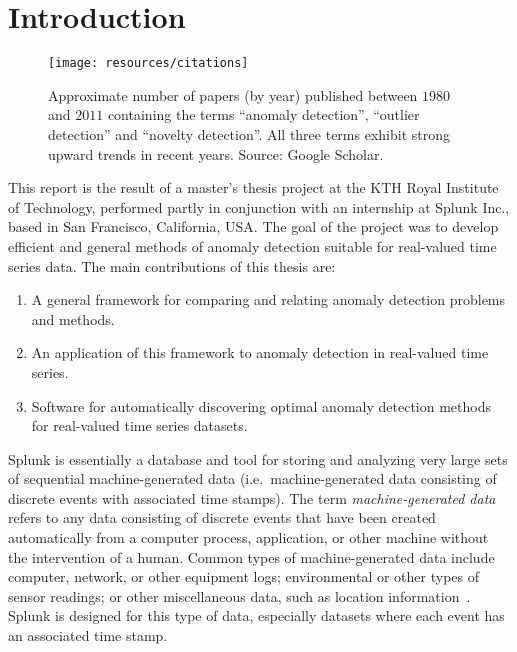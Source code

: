 \chapter{Introduction}

\begin{figure}[htb]
    \vspace{-10pt}
    \begin{center}
        \texttt{[image: resources/citations]}
    \end{center}
    \vspace{-20pt}
    \caption{\small Approximate number of papers (by year) published between $1980$ and $2011$ containing the terms ``anomaly detection'', ``outlier detection'' and ``novelty detection''. All three terms exhibit strong upward trends in recent years. Source: Google Scholar.}
    \vspace{-0pt}
\label{fig:citations}
\end{figure}

This report is the result of a master's thesis project at the KTH Royal Institute of Technology, performed partly in conjunction with an internship at Splunk Inc.\@, based in San Francisco, California, USA\@. The goal of the project was to develop efficient and general methods of anomaly detection suitable for real-valued time series data. The main contributions of this thesis are:
\begin{enumerate}
    \item A general framework for comparing and relating anomaly detection problems and methods.
    \item An application of this framework to anomaly detection in real-valued time series.
    \item Software for automatically discovering optimal anomaly detection methods for real-valued time series datasets.
\end{enumerate}

Splunk is essentially a database and tool for storing and analyzing very large sets of sequential machine-generated data (i.e.\ machine-generated data consisting of discrete events with associated time stamps). The term \emph{machine-generated data} refers to any data consisting of discrete events that have been created automatically from a computer process, application, or other machine without the intervention of a human. Common types of machine-generated data include computer, network, or other equipment logs; environmental or other types of sensor readings; or other miscellaneous data, such as location information~\cite{machine_data}. Splunk is designed for this type of data, especially datasets where each event has an associated time stamp.

